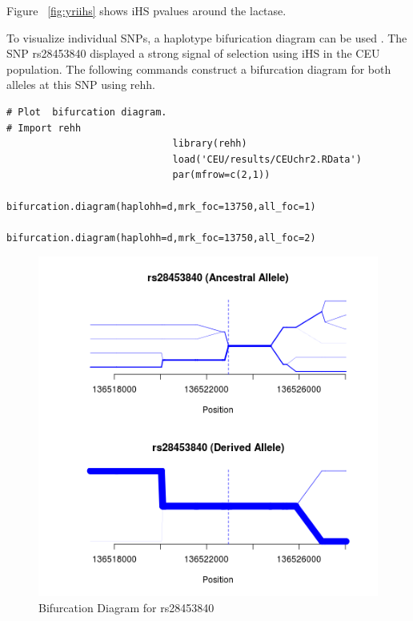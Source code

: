 \documentclass[a4paper,10pt]{article}
\begin{document}
                             \noindent
                             Figure ~\ref{fig:yriihs} shows iHS pvalues around the lactase.

                             To visualize individual SNPs, a haplotype bifurication diagram can be
                             used \citep{Gautier:2012et}. The SNP rs28453840 displayed a strong signal of
                             selection using iHS in the CEU population. The following commands construct a bifurcation diagram for both
                             alleles at this SNP using rehh. \\

                             \noindent

                             \begin{verbatim}
# Plot  bifurcation diagram.
# Import rehh 
                             library(rehh)
                             load('CEU/results/CEUchr2.RData')
                             par(mfrow=c(2,1))
                             bifurcation.diagram(haplohh=d,mrk_foc=13750,all_foc=1)
                             bifurcation.diagram(haplohh=d,mrk_foc=13750,all_foc=2)
                             \end{verbatim}
                             \begin{figure}
                             \centering
                             \includegraphics{pictures/bifurcationCEU.png}
                             \caption{Bifurcation Diagram for rs28453840}
                             \label{fig:bifurcationceu}
                             \end{figure}
\end{document}
